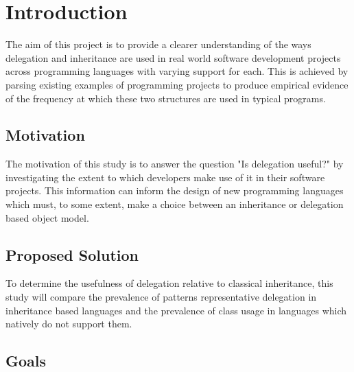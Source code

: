\chapter{Introduction}\label{C:intro}
The aim of this project is to provide a clearer understanding of the ways delegation and inheritance are used in real world software development projects across programming languages with varying support for each. This is achieved by parsing existing examples of programming projects to produce empirical evidence of the frequency at which these two structures are used in typical programs.

\section{Motivation}
The motivation of this study is to answer the question "Is delegation useful?" by investigating the extent to which developers make use of it in their software projects. This information can inform the design of new programming languages which must, to some extent, make a choice between an inheritance or delegation based object model.

\section{Proposed Solution}
To determine the usefulness of delegation relative to classical inheritance, this study will compare the prevalence of patterns representative delegation in inheritance based languages and the prevalence of class usage in languages which natively do not support them. 

\section{Goals}